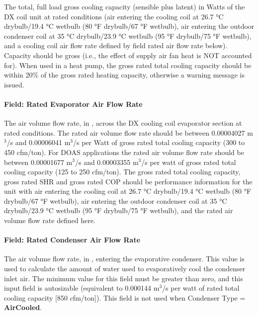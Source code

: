 The total, full load gross cooling capacity (sensible plus latent) in Watts of the DX coil unit at rated conditions (air entering the cooling coil at 26.7 °C drybulb/19.4 °C wetbulb (80 °F drybulb/67 °F wetbulb), air entering the outdoor condenser coil at 35 °C drybulb/23.9 °C wetbulb (95 °F drybulb/75 °F wetbulb), and a cooling coil air flow rate defined by field rated air flow rate below). Capacity should be gross (i.e., the effect of supply air fan heat is NOT accounted for). When used in a heat pump, the gross rated total cooling capacity should be within 20\% of the gross rated heating capacity, otherwise a warning message is issued.

\paragraph{Field: Rated Evaporator Air Flow Rate}\label{field-rated-evaporator-air-flow-rate-2}

The air volume flow rate, in \si{\volumeFlowRate}, across the DX cooling coil evaporator section at rated conditions. The rated air volume flow rate should be between 0.00004027 m\(^{3}\)/s and 0.00006041 m\(^{3}\)/s per Watt of gross rated total cooling capacity (300 to 450 cfm/ton). For DOAS applications the rated air volume flow rate should be between 0.00001677 m\(^{3}\)/s and 0.00003355 m\(^{3}\)/s per watt of gross rated total cooling capacity (125 to 250 cfm/ton). The gross rated total cooling capacity, gross rated SHR and gross rated COP should be performance information for the unit with air entering the cooling coil at 26.7 °C drybulb/19.4 °C wetbulb (80 °F drybulb/67 °F wetbulb), air entering the outdoor condenser coil at 35 °C drybulb/23.9 °C wetbulb (95 °F drybulb/75 °F wetbulb), and the rated air volume flow rate defined here.

\paragraph{Field: Rated Condenser Air Flow Rate}\label{field-rated-condenser-air-flow-rate-2}

The air volume flow rate, in \si{\volumeFlowRate}, entering the evaporative condenser. This value is used to calculate the amount of water used to evaporatively cool the condenser inlet air. The minimum value for this field must be greater than zero, and this input field is autosizable (equivalent to 0.000144 m\(^{3}\)/s per watt of rated total cooling capacity {[}850 cfm/ton{]}). This field is not used when Condenser Type = \textbf{AirCooled}.

